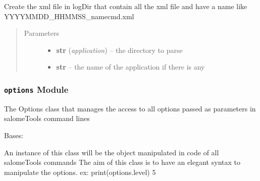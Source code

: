 \documentclass[a4paper,10pt,english]{sphinxmanual}
\begin{document}

\begin{fulllineitems}
\label{commands/apidoc/src:src.logger.update_hat_xml}
Create the xml file in logDir that contain all the xml file 
and have a name like YYYYMMDD\_HHMMSS\_namecmd.xml
\begin{quote}\begin{description}
\item[{Parameters}] \leavevmode\begin{itemize}
\item {} 
\textbf{str} (\emph{application}) -- the directory to parse

\item {} 
\textbf{str} -- the name of the application if there is any

\end{itemize}

\end{description}\end{quote}

\end{fulllineitems}



\subsubsection{\texttt{options} Module}
\label{commands/apidoc/src:module-src.options}\label{commands/apidoc/src:options-module}
The Options class that manages the access to all options passed as 
parameters in salomeTools command lines

\begin{fulllineitems}
\label{commands/apidoc/src:src.options.OptResult}
Bases: 

An instance of this class will be the object manipulated
in code of all salomeTools commands
The aim of this class is to have an elegant syntax 
to manipulate the options. 
ex: 
print(options.level)
5

\end{fulllineitems}

\end{document}

